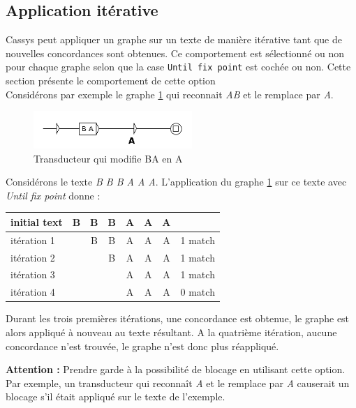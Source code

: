 \subsection{Application itérative}
\label{sub:AppWhiCon}

Cassys peut appliquer un graphe sur un texte de manière itérative tant que de nouvelles concordances sont obtenues.
Ce comportement est sélectionné ou non pour chaque graphe selon que la case \verb+Until fix point+ est cochée ou non. Cette section présente le comportement de cette option\\

Considérons par exemple le graphe \ref{fig:AB->A} qui reconnait \emph{AB} et le remplace par \emph{A}.\\

\begin{figure}[!htbp]
  \centering
  \includegraphics[width=6cm]{resources/img/AB_to_A.png}
  \caption{Transducteur qui modifie BA en A}
  \label{fig:AB->A}
\end{figure}

Considérons le texte \emph{B B B A A A}. L'application du graphe \ref{fig:AB->A} sur ce texte avec \emph{Until fix point}  donne :\\

\begin{tabular}{|l|cccccc|r|}
\hline
initial text  &B&B&B&A&A&A&\\
\hline
itération 1 & &B&B&A&A&A& 1 match\\
itération 2 & & &B&A&A&A& 1 match\\
itération 3 & & & &A&A&A& 1 match\\
itération 4 & & & &A&A&A& 0 match\\
\hline
\end{tabular}

\bigskip
Durant les trois premières itérations, une concordance est obtenue, le graphe
est alors appliqué à nouveau au texte résultant. A la quatrième itération, aucune
concordance n'est trouvée, le graphe n'est donc plus réappliqué.

\bigskip
\large{\textbf{Attention :}} Prendre garde à la possibilité de blocage en utilisant cette 
option. Par exemple, un transducteur qui reconnaît \emph{A} et le remplace par
\emph{A} causerait un blocage s'il était appliqué sur le texte de l'exemple.

